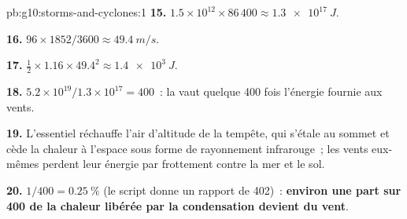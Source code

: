 \begin{solution}{pb:g10:storms-and-cyclones:1}
\textbf{15.} $1.5\times10^{12} \times 86\,400 \approx \qty{1.3e17}{J}$.

\textbf{16.} $96 \times 1852/3600 \approx \qty{49.4}{m/s}$.

\textbf{17.} $\frac12 \times 1.16 \times 49.4^2 \approx \qty{1.4e3}{J}$.

\textbf{18.} $5.2\times10^{19}/1.3\times10^{17} = 400$~: la 
vaut quelque 400 fois l'énergie fournie aux vents.

\textbf{19.} L'essentiel réchauffe l'air d'altitude de la tempête, qui
s'étale au sommet et cède la chaleur à l'espace sous forme de rayonnement
infrarouge~; les vents eux-mêmes perdent leur énergie par frottement contre
la mer et le sol.

\textbf{20.} $1/400 = \qty{0.25}{\percent}$ (le script donne un rapport de
402)~: \textbf{environ une part sur 400 de la chaleur libérée par la
condensation devient du vent}.
\end{solution}

